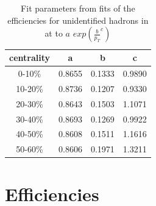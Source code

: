 \begin{table}
\begin{center}
\caption[Parameters from efficiency fits for unidentified hadrons in \Cu collisions at \sNNtwohundred]{Fit parameters from fits of the efficiencies for unidentified hadrons in \Au at \sNNsixtytwo to $a$  $exp(\frac{b}{p_T}^c)$}\label{CuCu200EfficiencyFitTable}
\begin{tabular}{c|c c c}
\hline
centrality & a & b & c \\ \hline
0-10\%  & 0.8655 & 0.1333 & 0.9890\\
10-20\% & 0.8736 & 0.1207 & 0.9330\\
20-30\% & 0.8643 & 0.1503 & 1.1071\\
30-40\% & 0.8693 & 0.1269 & 0.9922\\
40-50\% & 0.8608 & 0.1511 & 1.1616\\
50-60\% & 0.8606 & 0.1971 & 1.3211\\ \hline
\end{tabular}
\end{center}
\end{table}

% 
% 

\pagebreak 
\section{\vzero Efficiencies\label{v0efficiencyappendix}}


